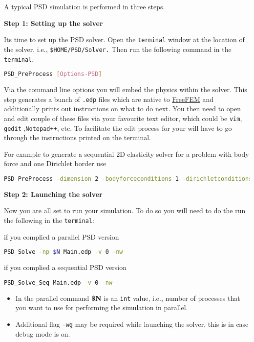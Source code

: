 A typical PSD simulation is performed in three steps.

\textbf{Step 1: Setting up the solver}

Its time to set up the PSD solver. Open the \lstinline!terminal! window
at the location of the solver, i.e., \lstinline!$HOME/PSD/Solver.! Then
run the following command in the \lstinline!terminal!.

\begin{lstlisting}[language=bash]
PSD_PreProcess [Options-PSD]
\end{lstlisting}

Via the command line options you will embed the physics within the
solver. This step generates a bunch of \lstinline!.edp! files which are
native to \href{https://freefem.org/}{FreeFEM} and additionally prints
out instructions on what to do next. You then need to open and edit
couple of these files via your favourite text editor, which could be
\lstinline!vim!, \lstinline!gedit! ,\lstinline!Notepad++!, etc. To
facilitate the edit process for your will have to go through the
instructions printed on the terminal.

For example to generate a sequential 2D elasticity solver for a problem
with body force and one Dirichlet border use

\begin{lstlisting}[language=bash]
PSD_PreProcess -dimension 2 -bodyforceconditions 1 -dirichletconditions 1
\end{lstlisting}

\textbf{Step 2: Launching the solver}

Now you are all set to run your simulation. To do so you will need to do
the run the following in the \lstinline!terminal!:

if you complied a parallel PSD version

\begin{lstlisting}[language=bash]
PSD_Solve -np $N Main.edp -v 0 -nw
\end{lstlisting}

if you complied a sequential PSD version

\begin{lstlisting}[language=bash]
PSD_Solve_Seq Main.edp -v 0 -nw
\end{lstlisting}

\begin{itemize}
\item
  In the parallel command \textbf{\$N} is an \lstinline!int! value,
  i.e., number of processes that you want to use for performing the
  simulation in parallel.
\item
  Additional flag \lstinline!-wg! may be required while launching the
  solver, this is in case debug mode is on.
\end{itemize}

